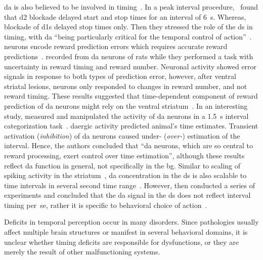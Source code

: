 \Gls{da} is also believed to be involved in timing~\cite{Paton2018NeuronRev}.
In a peak interval procedure,\footnotemark\  found that \gls{d2} blockade delayed start and stop times for an interval of 6~s.
Whereas, blockade of \glspl{d1} delayed stop times only.
Then they stressed the role of the \gls{ds} in timing, with \gls{da} ``being particularly critical for the temporal control of action''~\cite{DeCorte2019}.
 neurons encode reward prediction errors which requires accurate reward predictions~\cite[see][]{Berke2018NN}.
 recorded from \gls{da} neurons of rats while they performed a task with uncertainty in reward timing and reward number.
Neuronal activity showed error signals in response to both types of prediction error, however, after ventral striatal lesions, neurons only responded to changes in reward number, and not reward timing.
These results suggested that time-dependent component of reward prediction of \gls{da} neurons might rely on the ventral striatum~\cite{Takahashi2016}.
In an interesting study,  measured and manipulated the activity of \gls{da} neurons in a 1.5~s interval categorization task~\cite{Paton2016Sci}.
\Gls{da}ergic activity predicted animal's time estimates.
Transient activation (\textit{inhibition}) of \gls{da} neurons caused under- (\textit{over-}) estimation of the interval.
Hence, the authors concluded that ``\gls{da} neurons, which are so central to reward processing, exert control over time estimation'', although these results reflect \gls{da} function in general, not specifically in the \gls{bg}.
Similar to scaling of spiking activity in the striatum~\cite{Mello2015}, \gls{da} concentration in the \gls{ds} is also scalable to time intervals in several second time range~\cite{Howard2017}.
However, \citeauthor{Howard2017} then conducted a series of experiments and concluded that the \gls{da} signal in the \gls{ds} does not reflect interval timing per~se, rather it is specific to behavioral choice of action~\cite{Howard2017}.
\par
Deficits in temporal perception occur in many disorders.
Since pathologies usually affect multiple brain structures or manifest in several behavioral domains, it is unclear whether timing deficits are responsible for dysfunctions, or they are merely the result of other malfunctioning systems.
